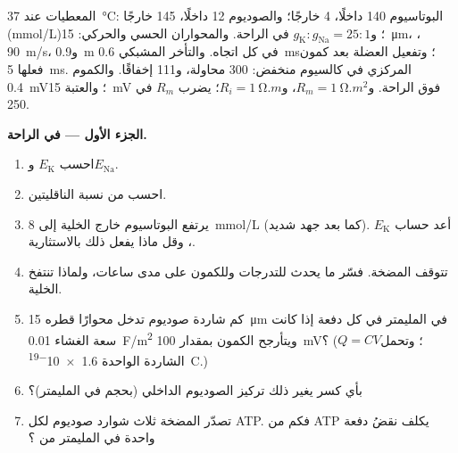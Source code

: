 \begin{problem}
\label{pb:b2:neurons-synapses:1}
المعطيات عند \qty{37}{\celsius}: البوتاسيوم 140 داخلًا، 4 خارجًا؛ والصوديوم 12 داخلًا،
145 خارجًا (\unit{mmol/L})؛ و$g_{\mathrm K} : g_{\mathrm{Na}} = 25 : 1$
في الراحة. والمحواران الحسي والحركي: \qty{15}{\micro m}، ،
\qty{90}{m/s}، و\qty{0.9}{m} في كل اتجاه. والتأخر المشبكي \qty{0.6}{ms}؛
وتفعيل العضلة بعد كمون فعلها \qty{5}{ms}.
 المركزي في كالسيوم منخفض: 300 محاولة، و111 إخفاقًا. والكموم
\qty{0.4}{mV}؛ والعتبة \qty{15}{mV} فوق الراحة. و$R_m =
\qty{1}{\ohm.m^2}$، و$R_i = \qty{1}{\ohm.m}$؛  يضرب $R_m$
في 250.

\medskip
\noindent\textbf{الجزء الأول ---  في الراحة.}
\begin{enumerate}
  \item احسب $E_{\mathrm K}$ و$E_{\mathrm{Na}}$.
  \item احسب  من نسبة الناقليتين.
  \item يرتفع البوتاسيوم خارج الخلية إلى \qty{8}{mmol/L} (كما
        بعد جهد شديد). أعد حساب $E_{\mathrm K}$ ، وقل ماذا يفعل ذلك بالاستثارية.
  \item تتوقف المضخة. فسّر ما يحدث للتدرجات وللكمون
        على مدى ساعات، ولماذا تنتفخ الخلية.
  \item كم شاردة صوديوم تدخل محوارًا قطره \qty{15}{\micro m}
        في المليمتر في كل دفعة إذا كانت سعة الغشاء
        \qty{0.01}{F/m^2} ويتأرجح الكمون بمقدار \qty{100}{mV}؟
        ($Q = CV$؛ وتحمل الشاردة الواحدة \qty{1.6e-19}{C}.)
  \item بأي كسر يغير ذلك تركيز الصوديوم
        الداخلي (بحجم  في المليمتر)؟
  \item تصدّر المضخة ثلاث شوارد صوديوم لكل ATP. فكم من ATP
        يكلف نقضُ دفعة واحدة في المليمتر من ؟
\end{enumerate}


\end{problem}
